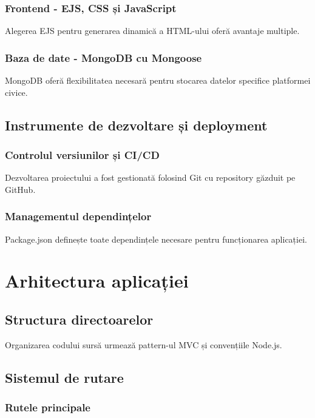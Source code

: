 \documentclass[12pt,a4paper]{report}
\begin{document}
\subsubsection{Frontend - EJS, CSS și JavaScript}

Alegerea EJS pentru generarea dinamică a HTML-ului oferă avantaje multiple.

\subsubsection{Baza de date - MongoDB cu Mongoose}

MongoDB oferă flexibilitatea necesară pentru stocarea datelor specifice platformei civice.

\subsection{Instrumente de dezvoltare și deployment}

\subsubsection{Controlul versiunilor și CI/CD}

Dezvoltarea proiectului a fost gestionată folosind Git cu repository găzduit pe GitHub.

\subsubsection{Managementul dependințelor}

Package.json definește toate dependințele necesare pentru funcționarea aplicației.

\section{Arhitectura aplicației}

\subsection{Structura directoarelor}

Organizarea codului sursă urmează pattern-ul MVC și convențiile Node.js.

\subsection{Sistemul de rutare}

\subsubsection{Rutele principale}
\end{document}

